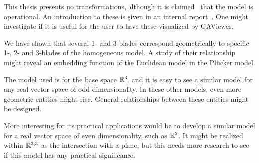 This thesis presents no transformations, although it is claimed~\cite{Hongbo} that the model is operational.  An introduction to these is given in an internal report~\cite{internal}.  One might investigate if it is useful for the user to have these visualized by GAViewer. 

We have shown that several 1- and 3-blades correspond geometrically to specific 1-, 2- and 3-blades of the homogeneous model.  A study of their relationship might reveal an embedding function of the Euclidean model in the Pl\"ucker model.

The model used is for the base space $\mathbb{R}^3$, and it is easy to see a similar model for any real vector space of odd dimensionality.  In these other models, even more geometric entities might rise.  General relationships between these entities might be designed.

More interesting for its practical applications would be to develop a similar model for a real vector space of even dimensionality, such as $\mathbb{R}^2$.  It might be realized within $\mathbb{R}^{3,3}$ as the intersection with a plane, but this needs more research to see if this model has any practical significance.
